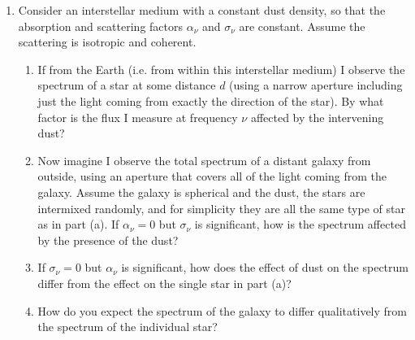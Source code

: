 \documentclass[11pt, preprint]{article}
\begin{document}
\begin{enumerate}
\item Consider an interstellar medium with a constant dust density, so
  that the absorption and scattering factors $\alpha_\nu$ and
  $\sigma_\nu$ are constant. Assume the scattering is isotropic and
  coherent.
  \begin{enumerate}
    \item If from the Earth (i.e. from within this interstellar
      medium) I observe the spectrum of a star at some distance $d$
      (using a narrow aperture including just the light coming from
      exactly the direction of the star). By what factor is the flux I
      measure at frequency $\nu$ affected by the intervening dust?
    \item Now imagine I observe the total spectrum of a distant galaxy
      from outside, using an aperture that covers all of the light
      coming from the galaxy. Assume the galaxy is spherical and the
      dust, the stars are intermixed randomly, and for simplicity they
      are all the same type of star as in part (a).  If $\alpha_\nu =
      0$ but $\sigma_\nu$ is significant, how is the spectrum affected
      by the presence of the dust?
    \item If $\sigma_\nu = 0$ but $\alpha_\nu$ is significant, how
      does the effect of dust on the spectrum differ from the effect
      on the single star in part (a)?
    \item How do you expect the spectrum of the galaxy to differ
      qualitatively from the spectrum of the individual star?
  \end{enumerate}
  
\end{enumerate}
\end{document}
